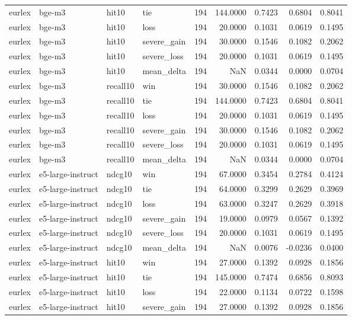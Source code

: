 \begin{tabular}{llllrrrrr}
eurlex & bge-m3 & hit10 & tie & 194 & 144.0000 & 0.7423 & 0.6804 & 0.8041 \\
eurlex & bge-m3 & hit10 & loss & 194 & 20.0000 & 0.1031 & 0.0619 & 0.1495 \\
eurlex & bge-m3 & hit10 & severe\_gain & 194 & 30.0000 & 0.1546 & 0.1082 & 0.2062 \\
eurlex & bge-m3 & hit10 & severe\_loss & 194 & 20.0000 & 0.1031 & 0.0619 & 0.1495 \\
eurlex & bge-m3 & hit10 & mean\_delta & 194 & NaN & 0.0344 & 0.0000 & 0.0704 \\
eurlex & bge-m3 & recall10 & win & 194 & 30.0000 & 0.1546 & 0.1082 & 0.2062 \\
eurlex & bge-m3 & recall10 & tie & 194 & 144.0000 & 0.7423 & 0.6804 & 0.8041 \\
eurlex & bge-m3 & recall10 & loss & 194 & 20.0000 & 0.1031 & 0.0619 & 0.1495 \\
eurlex & bge-m3 & recall10 & severe\_gain & 194 & 30.0000 & 0.1546 & 0.1082 & 0.2062 \\
eurlex & bge-m3 & recall10 & severe\_loss & 194 & 20.0000 & 0.1031 & 0.0619 & 0.1495 \\
eurlex & bge-m3 & recall10 & mean\_delta & 194 & NaN & 0.0344 & 0.0000 & 0.0704 \\
eurlex & e5-large-instruct & ndcg10 & win & 194 & 67.0000 & 0.3454 & 0.2784 & 0.4124 \\
eurlex & e5-large-instruct & ndcg10 & tie & 194 & 64.0000 & 0.3299 & 0.2629 & 0.3969 \\
eurlex & e5-large-instruct & ndcg10 & loss & 194 & 63.0000 & 0.3247 & 0.2629 & 0.3918 \\
eurlex & e5-large-instruct & ndcg10 & severe\_gain & 194 & 19.0000 & 0.0979 & 0.0567 & 0.1392 \\
eurlex & e5-large-instruct & ndcg10 & severe\_loss & 194 & 20.0000 & 0.1031 & 0.0619 & 0.1495 \\
eurlex & e5-large-instruct & ndcg10 & mean\_delta & 194 & NaN & 0.0076 & -0.0236 & 0.0400 \\
eurlex & e5-large-instruct & hit10 & win & 194 & 27.0000 & 0.1392 & 0.0928 & 0.1856 \\
eurlex & e5-large-instruct & hit10 & tie & 194 & 145.0000 & 0.7474 & 0.6856 & 0.8093 \\
eurlex & e5-large-instruct & hit10 & loss & 194 & 22.0000 & 0.1134 & 0.0722 & 0.1598 \\
eurlex & e5-large-instruct & hit10 & severe\_gain & 194 & 27.0000 & 0.1392 & 0.0928 & 0.1856 \\

\end{tabular}

